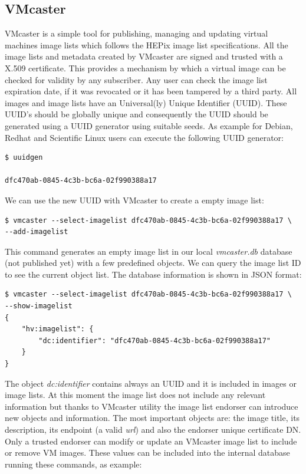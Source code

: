 \documentclass[oribibl]{llncs_Ibergrid2013}
\begin{document}
\subsection{VMcaster}
VMcaster is a simple tool for publishing, managing and updating virtual machines image lists which follows the HEPix image list specifications.
All the image lists and metadata created by VMcaster are signed and trusted with a X.509 certificate.
This provides a mechanism by which a virtual image can be checked for validity by any subscriber. Any user can check the image list expiration date, if it was revocated or it has been tampered by a third party.
All images and image lists have an Universal(ly) Unique Identifier (UUID). These UUID's should be globally unique and consequently the UUID should be generated using a UUID generator using suitable seeds. As example for Debian, Redhat and Scientific Linux users can execute the following UUID generator:
\begin{verbatim}
$ uuidgen

dfc470ab-0845-4c3b-bc6a-02f990388a17
\end{verbatim}
We can use the new UUID with VMcaster to create a empty image list:
\begin{verbatim}
$ vmcaster --select-imagelist dfc470ab-0845-4c3b-bc6a-02f990388a17 \
--add-imagelist
\end{verbatim}
This command generates an empty image list in our local \textit{vmcaster.db} database (not published yet) with a few predefined objects. We can query the image list ID to see the current object list.
The database information is shown in JSON format:
\begin{verbatim}
$ vmcaster --select-imagelist dfc470ab-0845-4c3b-bc6a-02f990388a17 \
--show-imagelist
{
    "hv:imagelist": {
        "dc:identifier": "dfc470ab-0845-4c3b-bc6a-02f990388a17"
    }
}
\end{verbatim}
The object \textit{dc:identifier} contains always an UUID and it is included in images or image lists. 
At this moment the image list does not include any relevant information but thanks to VMcaster utility the image list endorser can introduce new objects and information.
The most important objects are: the image title, its description, its endpoint (a valid \textit{url}) and also the endorser unique certificate DN. Only a trusted endorser can modify or update an VMcaster image list to include or remove VM images. 
These values can be included into the internal database running these commands, as example:
\end{document}
